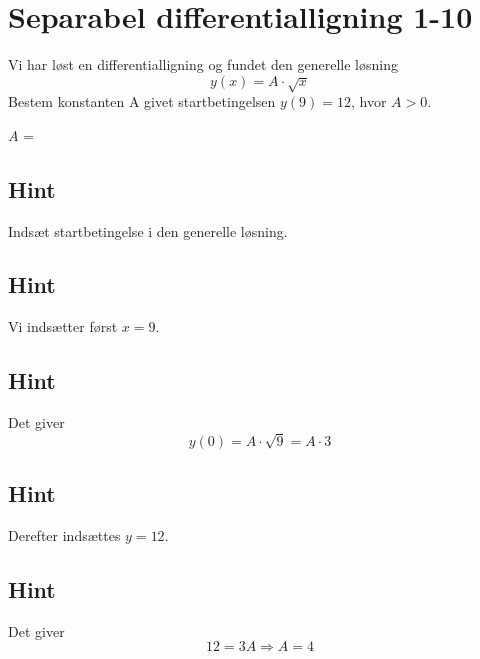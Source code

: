 \documentclass{article}
\newenvironment{exercise}[1]{\newpage\section{#1}}{}
\newcommand{\answerbox}[1]{\fbox{$#1$}}
\newcommand{\hint}{\subsection*{Hint}}
\begin{document}
\begin{exercise}{Separabel differentialligning 1-10}
	
	
	Vi har løst en differentialligning og fundet den generelle løsning
	\[
	y(x) =  A \cdot \sqrt{x}
	\]
	Bestem konstanten A givet startbetingelsen $y(9)=12$, hvor $A>0$.
	
	$A$ = \answerbox{4}
	
	\hint
	
	Indsæt startbetingelse i den generelle løsning. 
	
	
	\hint
	
	Vi indsætter først $x=9$.
	
	\hint
	
	Det giver
	\[
	y(0)=  A \cdot \sqrt{9} = A	\cdot 3
	\]
	
	\hint
	
	Derefter indsættes $y=12$.
	
	\hint 
	
	Det giver 
	\[
	12  = 3A  \Rightarrow A = 4
	\]
	
\end{exercise}
\end{document}

